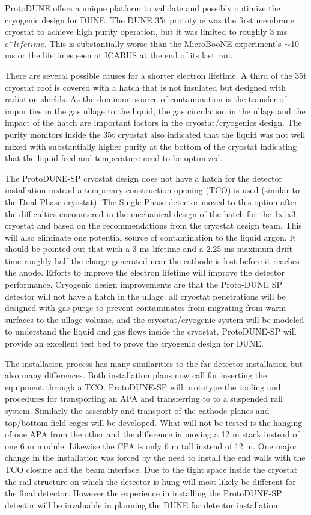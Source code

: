 ProtoDUNE offers a unique platform to validate and possibly optimize the cryogenic design for DUNE. The DUNE 35t prototype was the first membrane cryostat to achieve high purity operation, but it was limited to roughly 3 ms $e^-lifetime$. This is substantially worse than the MicroBooNE experiment's  $\sim$10 ms or the lifetimes seen at ICARUS at the end of its last run. 

There are several possible causes for a shorter electron lifetime.  A third of the 35t cryostat roof is covered with a hatch that is not insulated but designed with radiation shields. As the dominant source of contamination is the transfer of impurities in the gas ullage to the liquid, the gas circulation in the ullage and the impact of the hatch are important factors in the cryostat/cryogenics design. The purity monitors inside the 35t cryostat also indicated that the liquid was not well mixed with substantially higher purity at the bottom of the cryostat indicating that the liquid feed and temperature need to be optimized.  

The ProtoDUNE-SP cryostat design does not have a hatch for the detector installation instead a temporary construction opening (TCO) is used (similar to the Dual-Phase cryostat). The Single-Phase detector moved to this option after the difficulties encountered in the mechanical design of the hatch for the 1x1x3 cryostat and based on the recommendations from the cryostat design team.  This will also eliminate one potential source of contamination to the liquid argon. It should be pointed out that with a 3 ms lifetime and a 2.25 ms maximum drift time roughly half the charge generated near the cathode is lost before it reaches the anode. Efforts to improve the electron lifetime will improve the detector performance.  Cryogenic design improvements are that the Proto-DUNE SP detector will not have a hatch in the ullage, all cryostat penetrations will be designed with gas purge to prevent contaminates from migrating from warm surfaces to the ullage volume, and the cryostat/cryogenic system will be modeled to understand the liquid and gas flows inside the cryostat. ProtoDUNE-SP will provide an excellent test bed to prove the cryogenic design for DUNE. 

The installation process has many similarities to the far detector installation but also many differences. Both installation plans now call for inserting the equipment through a TCO. ProtoDUNE-SP will prototype the tooling and procedures for transporting an APA and transferring to to a suspended rail system. Similarly the assembly and transport of the cathode planes and top/bottom field cages will be developed. What will not be tested is the hanging of one APA from the other and the difference in moving a 12 m stack instead of one 6 m module. Likewise the CPA is only 6 m tall instead of 12 m. One major change in the installation was forced by the need to install the end walls with the TCO closure and the beam interface. Due to the tight space inside the cryostat the rail structure on which the detector is hung will most likely be different for the final detector. However the experience in installing the ProtoDUNE-SP detector will be invaluable in planning the DUNE far detector installation. 

